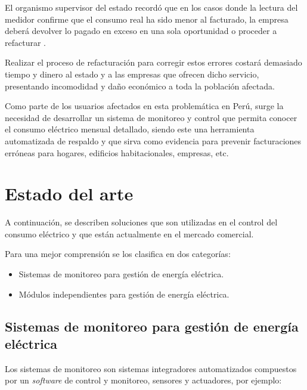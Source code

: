 El organismo supervisor del estado recordó que en los casos donde la lectura del medidor confirme que el consumo real ha sido menor al facturado, la empresa deberá devolver lo pagado en exceso en una sola oportunidad o proceder a refacturar \citep{WEBSITE:2}.

Realizar el proceso de refacturación para corregir estos errores costará demasiado tiempo y dinero al estado y a las empresas que ofrecen dicho servicio, presentando incomodidad y daño económico a toda la población afectada. 

Como parte de los usuarios afectados en esta problemática en Perú, surge la necesidad de desarrollar un sistema de monitoreo y control que permita conocer el consumo eléctrico mensual detallado, siendo este una herramienta automatizada de respaldo y que sirva como evidencia para prevenir facturaciones erróneas para hogares, edificios habitacionales, empresas, etc.

\section{Estado del arte}

A continuación, se describen soluciones que son utilizadas en el control del consumo eléctrico y que están actualmente en el mercado comercial. 

Para una mejor comprensión se los clasifica en dos categorías:

\begin{itemize}
\item Sistemas de monitoreo para gestión de energía eléctrica.
\item Módulos independientes para gestión de energía eléctrica.
\end{itemize} 

\subsection{Sistemas de monitoreo para gestión de energía eléctrica}
Los sistemas de monitoreo son sistemas integradores automatizados compuestos por un \emph{software} de control y monitoreo, sensores y actuadores, por ejemplo:

